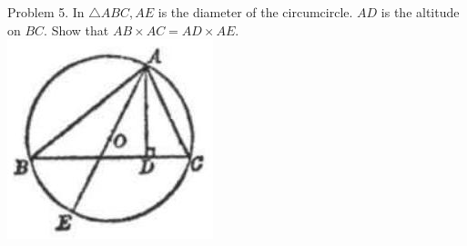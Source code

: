 \documentclass[10pt]{article}
\begin{document}
Problem 5. In \(\triangle A B C, A E\) is the diameter of the circumcircle. \(A D\) is the altitude on \(B C\). Show that \(A B \times A C=A D \times A E\).\\
\includegraphics[max width=\textwidth, center]{2025_04_17_97bc1f7e44d93c271a88g-169(1)}
\end{document}
